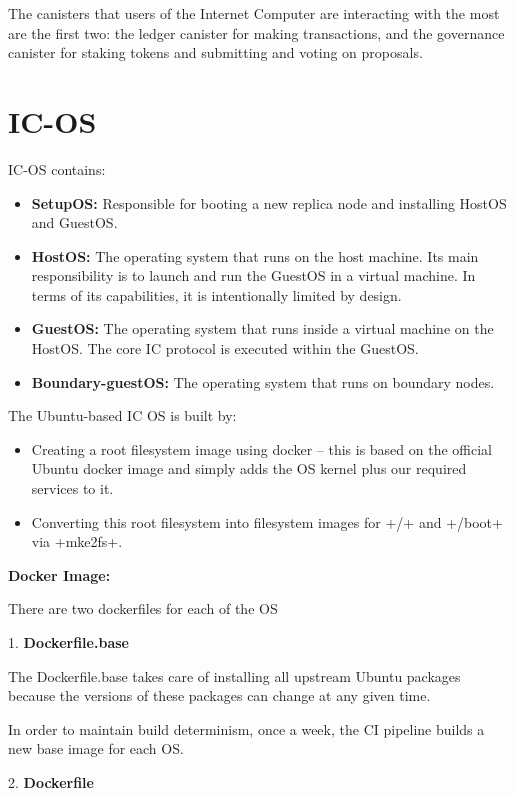 The canisters that users of the Internet Computer are interacting with the most are the first two: the ledger canister for making transactions, and the governance canister for staking tokens and submitting and voting on proposals.



\section{IC-OS}

IC-OS contains:

\begin{itemize}
  \item \textbf{SetupOS:} Responsible for booting a new replica node and installing HostOS and GuestOS.
  \item \textbf{HostOS:} The operating system that runs on the host machine. Its main responsibility is to launch and run the GuestOS in a virtual machine. In terms of its capabilities, it is intentionally limited by design.
  \item \textbf{GuestOS:} The operating system that runs inside a virtual machine on the HostOS. The core IC protocol is executed within the GuestOS.
  \item \textbf{Boundary-guestOS:} The operating system that runs on boundary nodes.
\end{itemize}

The Ubuntu-based IC OS is built by:

\begin{itemize}
  \item Creating a root filesystem image using docker -- this is based on the official Ubuntu docker image and simply adds the OS kernel plus our required services to it.
  \item Converting this root filesystem into filesystem images for +/+ and +/boot+ via +mke2fs+.
\end{itemize}

\textbf{Docker Image:}

There are two dockerfiles for each of the OS

1. \textbf{Dockerfile.base}

The Dockerfile.base takes care of installing all upstream Ubuntu packages because the versions of these packages can change at any given time.

In order to maintain build determinism, once a week, the CI pipeline builds a new base image for each OS.

2. \textbf{Dockerfile}

